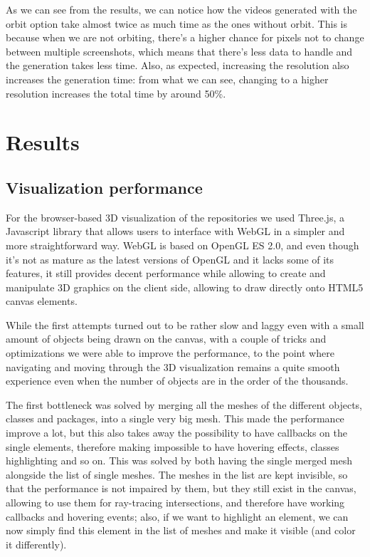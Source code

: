 \documentclass[]{usiinfbachelorproject}
\begin{document}
As we can see from the results, we can notice how the videos generated with the orbit option take almost twice as much time
as the ones without orbit. This is because when we are not orbiting, there's a higher chance for pixels not to change between multiple screenshots, which means that there's less data to handle and the generation takes less time.
Also, as expected, increasing the resolution also increases the generation time: from what we can see, changing to a higher resolution increases the total time by around 50\%.

\section{Results} \label{Results}

\subsection{Visualization performance} \label{Visualization performance}

For the browser-based 3D visualization of the repositories we used Three.js, a Javascript library that allows users to interface with WebGL in a simpler and more straightforward way. WebGL is based on OpenGL ES 2.0, and even though it's not as mature as the latest versions of OpenGL and it lacks some of its features, it still provides decent performance while allowing to create and manipulate 3D graphics on the client side, allowing to draw directly onto HTML5 canvas elements.

While the first attempts turned out to be rather slow and laggy even with a small amount of objects being drawn on the canvas, with a couple of tricks and optimizations we were able to improve the performance, to the point where navigating and moving through the 3D visualization remains a quite smooth experience even when the number of objects are in the order of the thousands.

The first bottleneck was solved by merging all the meshes of the different objects, classes and packages, into a single very big mesh. This made the performance improve a lot, but this also takes away the possibility to have callbacks on the single elements, therefore making impossible to have hovering effects, classes highlighting and so on. This was solved by both having the single merged mesh alongside the list of single meshes. The meshes in the list are kept invisible, so that the performance is not impaired by them, but they still exist in the canvas, allowing to use them for ray-tracing intersections, and therefore have working callbacks and hovering events; also, if we want to highlight an element, we can now simply find this element in the list of meshes and make it visible (and color it differently).
\end{document}
